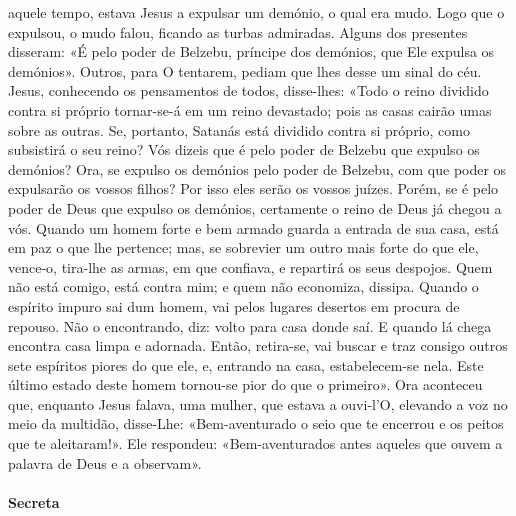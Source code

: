 \begin{paracol}{2}
{aquele{} tempo, estava Jesus a expulsar um demónio, o qual era mudo. Logo que o expulsou, o mudo falou, ficando as turbas admiradas. Alguns dos presentes disseram: «É pelo poder de Belzebu, príncipe dos demónios, que Ele expulsa os demónios». Outros, para O tentarem, pediam que lhes desse um sinal do céu. Jesus, conhecendo os pensamentos de todos, disse-lhes: «Todo o reino dividido contra si próprio tornar-se-á em um reino devastado; pois as casas cairão umas sobre as outras. Se, portanto, Satanás está dividido contra si próprio, como subsistirá o seu reino? Vós dizeis que é pelo poder de Belzebu que expulso os demónios? Ora, se expulso os demónios pelo poder de Belzebu, com que poder os expulsarão os vossos filhos? Por isso eles serão os vossos juízes. Porém, se é pelo poder de Deus que expulso os demónios, certamente o reino de Deus já chegou a vós. Quando um homem forte e bem armado guarda a entrada de sua casa, está em paz o que lhe pertence; mas, se sobrevier um outro mais forte do que ele, vence-o, tira-lhe as armas, em que confiava, e repartirá os seus despojos. Quem não está comigo, está contra mim; e quem não economiza, dissipa. Quando o espírito impuro sai dum homem, vai pelos lugares desertos em procura de repouso. Não o encontrando, diz: volto para casa donde saí. E quando lá chega encontra casa limpa e adornada. Então, retira-se, vai buscar e traz consigo outros sete espíritos piores do que ele, e, entrando na casa, estabelecem-se nela. Este último estado deste homem tornou-se pior do que o primeiro». Ora aconteceu que, enquanto Jesus falava, uma mulher, que estava a ouvi-l’O, elevando a voz no meio da multidão, disse-Lhe: «Bem-aventurado o seio que te encerrou e os peitos que te aleitaram!». Ele respondeu: «Bem-aventurados antes aqueles que ouvem a palavra de Deus e a observam».
}\end{paracol}

\begin{paracol}{2}\switchcolumn{}\end{paracol}

\paragraph{Secreta}
\begin{paracol}{2}\switchcolumn{}\end{paracol}

